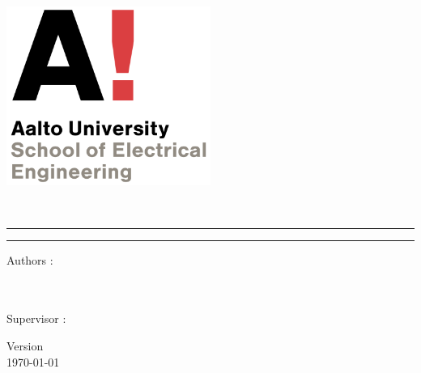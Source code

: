 \begin{titlepage}
    \begin{center}
        \vspace*{0.5cm}
        \includegraphics[width=0.5\textwidth]{IMGs/Aalto_LOG}
        
        \vspace{1.5cm}
        \Large
        \textbf{\matiere}\\
        
        \vspace{0.5cm}
        
        \huge
        \rule{\linewidth}{0.3mm}
        \textbf{\titre}
        \rule{\linewidth}{0.3mm} 
        
        \vspace{1.5cm}
        \large
        Authors :\\
        \authorFullName\\
        \authorFullNametwo\\
        \authorFullNamethree
    
        \vspace{0.7cm}
        
        Supervisor :\\
        \textbf{\prof} 
        
        \vfill
        
        Version \versionControl \\
        \today
            
    \end{center}
\end{titlepage}